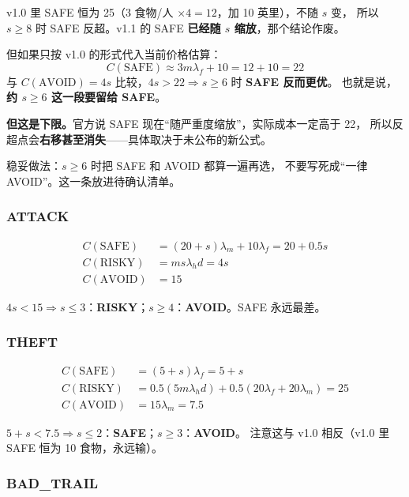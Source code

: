 \documentclass[UTF8,11pt,a4paper]{ctexart}
\begin{document}
\begin{warnbox}[title={v1.0 的“三段结构”要改口，但不能说 SAFE 永远出局}]
v1.0 里 SAFE 恒为 25（$3$ 食物/人 $\times4=12$，加 10 英里），不随 $s$ 变，
所以 $s\ge8$ 时 SAFE 反超。v1.1 的 SAFE \textbf{已经随 $s$ 缩放}，那个结论作废。

但如果只按 v1.0 的形式代入当前价格估算：
\[
C(\text{SAFE})\approx 3m\lambda_f+10=12+10=22
\]
与 $C(\text{AVOID})=4s$ 比较，$4s>22\Rightarrow s\ge6$ 时 \textbf{SAFE 反而更优}。
也就是说，\textbf{约 $s\ge6$ 这一段要留给 SAFE}。

\textbf{但这是下限。}官方说 SAFE 现在“随严重度缩放”，实际成本一定高于 22，
所以反超点会\textbf{右移甚至消失}——具体取决于未公布的新公式。

\noindent 稳妥做法：$s\ge6$ 时把 SAFE 和 AVOID 都算一遍再选，
不要写死成“一律 AVOID”。这一条放进待确认清单。
\end{warnbox}

\subsubsection*{ATTACK}

\begin{align*}
C(\text{SAFE})&=(20+s)\lambda_m+10\lambda_f=20+0.5s\\
C(\text{RISKY})&=m s\lambda_h d=4s\\
C(\text{AVOID})&=15
\end{align*}

$4s<15\Rightarrow s\le3$：\textbf{RISKY}；$s\ge4$：\textbf{AVOID}。SAFE 永远最差。

\subsubsection*{THEFT}

\begin{align*}
C(\text{SAFE})&=(5+s)\lambda_f=5+s\\
C(\text{RISKY})&=0.5(5m\lambda_h d)+0.5(20\lambda_f+20\lambda_m)=25\\
C(\text{AVOID})&=15\lambda_m=7.5
\end{align*}

$5+s<7.5\Rightarrow s\le2$：\textbf{SAFE}；$s\ge3$：\textbf{AVOID}。
注意这与 v1.0 相反（v1.0 里 SAFE 恒为 10 食物，永远输）。

\subsubsection*{BAD\_TRAIL}
\end{document}
